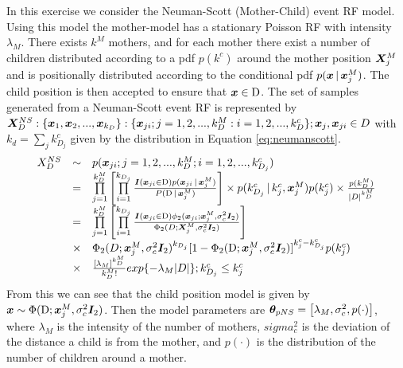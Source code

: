 \section{}
\label{sec:problem3}
In this exercise we consider the Neuman-Scott (Mother-Child) event RF model. Using this model the mother-model has a stationary Poisson RF with intensity $\lambda_M$. There exists $k^M$ mothers, and for each mother there exist a number of children distributed according to a pdf $p(k^c)$ around the mother position $\bm{X}_j^M$ and is positionally distributed according to the conditional pdf $p(\bm{x} \, | \, \bm{x}_j^M)$. The child position is then accepted to ensure that $\bm{x} \in \mathrm{D}$. The set of samples generated from a Neuman-Scott event RF is represented by $\bm{X}_D^{NS}:\{\bm{x}_1,\bm{x}_2,...,\bm{x}_{k_D}\}:\{\bm{x}_{ji};j=1,2,...,k_D^M:i = 1,2,...,k_D^c\};\bm{x}_j,\bm{x}_{ji}\in D$ with $k_d = \sum_j k_{D_j}^c$ given by the distribution in Equation \ref{eq:neumanscott}.
\begin{equation}
    \begin{array}{lll}
        X_D^{NS} & \sim & p(\bm{x}_{ji}; j = 1,2,...,k_D^M; i =1,2,...,k_{D_j}^c) \\
         & = & \prod\limits_{j=1}^{k_D^M}\left[\prod\limits_{i=1}^{k_{D_j}}\frac{ \bm{I}(\bm{x}_{ji}\in \mathrm{D})p(\bm{x}_{ji}\, | \, \bm{x}_j^M)}{ P(\mathrm{D}\, | \, \bm{x}_j^M)}\right]\times p(k_{D_j}^c\, | \, k_j^c,\bm{x}_j^M)p(k_j^c)\times \frac{p(k_D^M)}{|D|^{k_D^M}} \\
         & = & \prod\limits_{j=1}^{k_D^M}\left[\prod\limits_{i=1}^{k_{D_j}}\frac{ \bm{I}(\bm{x}_{ji}\in \mathrm{D}) \phi_2(\bm{x}_{ji};\bm{x}_j^M,\sigma_c^2\bm{I}_2)}{ \Phi_2(D;\bm{X}_j^M,\sigma_c^2\bm{I}_2 )}\right] \\
         & \times & \Phi_2(D;\bm{x}_j^M,\sigma_c^2\bm{I}_2)^{k_{D_j}}[1-\Phi_2(\mathrm{D};\bm{x}_j^M,\sigma_c^2\bm{I}_2)]^{k_j^c-k_{D_j}^c}p(k_j^c)\\
          & \times & \frac{[\lambda_M]^{k_D^M}}{k_D^M!}exp\{-\lambda_M|D|\};k_{D_j}^c\leq k_j^c
         \end{array}
    \label{eq:neumanscott}
\end{equation}
From this we can see that the child position model is given by $\bm{x} \sim \Phi(\mathrm{D};\bm{x}_j^M, \sigma_c^2\bm{I}_2)$. Then the model parameters are $\bm{\theta}_{pNS} = \left[\lambda_M,\sigma_c^2,p(\cdot)\right]$, where $\lambda_M$ is the intensity of the number of mothers, $sigma_c^2$ is the deviation of the distance a child is from the mother, and $p(\cdot)$ is the distribution of the number of children around a mother. 

